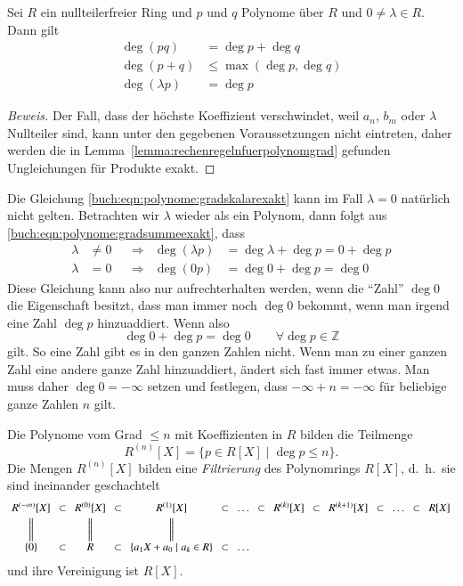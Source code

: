 \begin{lemma}
Sei $R$ ein nullteilerfreier Ring und $p$ und $q$ Polynome über $R$
und $0\ne \lambda\in R$.
Dann gilt
\begin{align}
\deg(pq) &= \deg p + \deg q
\label{buch:eqn:polynome:gradsummeexakt}
\\
\deg(p+q) &\le \max(\deg p, \deg q)
\label{buch:eqn:polynome:gradproduktexakt}
\\
\deg(\lambda p) &= \deg p
\label{buch:eqn:polynome:gradskalarexakt}
\end{align}
\end{lemma}

\begin{proof}[Beweis]
Der Fall, dass der höchste Koeffizient verschwindet, weil $a_n$, $b_m$
oder $\lambda$ Nullteiler sind, kann unter den gegebenen Voraussetzungen
nicht eintreten, daher werden die in
Lemma~\ref{lemma:rechenregelnfuerpolynomgrad} gefunden Ungleichungen
für Produkte exakt.
\end{proof}

Die Gleichung
\eqref{buch:eqn:polynome:gradskalarexakt}
kann im Fall $\lambda=0$ natürlich nicht gelten.
Betrachten wir $\lambda$ wieder als ein Polynom, dann folgt aus
\eqref{buch:eqn:polynome:gradsummeexakt}, dass
\[
\begin{aligned}
\lambda&\ne 0  &&\Rightarrow& \deg (\lambda p) &= \deg\lambda + \deg p = 0+\deg p
\\
\lambda&=0     &&\Rightarrow& \deg (0 p) &= \deg 0 + \deg p = \deg 0
\end{aligned}
\]
Diese Gleichung kann also nur aufrechterhalten werden, wenn die ``Zahl'' $\deg 0$ die Eigenschaft besitzt, dass man immer noch $\deg 0$ bekommt,
wenn man irgend eine Zahl $\deg p$ hinzuaddiert. Wenn also
\[\deg 0 + \deg p = \deg 0 \qquad \forall \deg p \in \mathbb Z\]
gilt.
So eine Zahl gibt es in den ganzen Zahlen nicht.
Wenn man zu einer ganzen Zahl eine andere ganze Zahl hinzuaddiert, ändert sich fast immer etwas.
Man muss daher $\deg 0 = -\infty$ setzen und festlegen, dass
$-\infty + n = -\infty$ für beliebige ganze Zahlen $n$ gilt.

\begin{definition}
\label{buch:def:definitionen:polynomfilterung}
Die Polynome vom Grad $\le n$ mit Koeffizienten in $R$
bilden die Teilmenge
\[
R^{(n)}[X]
=
\{ p\in R[X] \mid \deg p \le n\}.
\]
Die Mengen $R^{(n)}[X]$ bilden eine {\em Filtrierung} des Polynomrings
$R[X]$, d.~h.~sie sind ineinander geschachtelt
\[
\arraycolsep=4pt
\begin{array}{ccccccccccccccc}
R^{(-\infty)}[X] & \subset
	& R^{(0)}[X] & \subset
		& R^{(1)}[X] & \subset & \dots & \subset
			& R^{(k)}[X] & \subset
				& R^{(k+1)}[X] & \subset & \dots & \subset
					& R[X]\\[3pt]
\bigg\| &
	&\bigg\| &
		&\bigg\| & & &
			&&
				&& & &
					&
\\[3pt]
\{0\} & \subset
	& R & \subset
		& \{a_1X+a_0 \mid a_k\in R\} & \subset & \dots &
\end{array}
\]
und ihre Vereinigung ist $R[X]$.
\end{definition}

